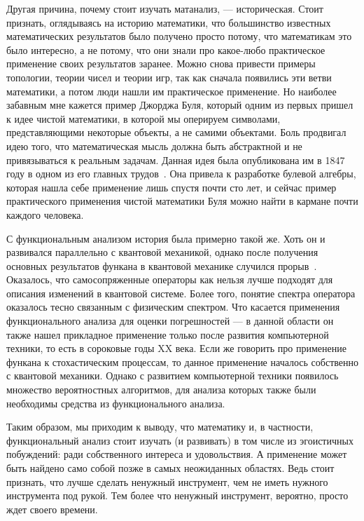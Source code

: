 \documentclass[russian]{article}
\begin{document}
Другая причина, почему стоит изучать матанализ, --- историческая. Стоит признать, оглядываясь на историю математики, что большинство известных математических результатов было получено просто потому, что математикам это было интересно, а не потому, что они знали про какое-любо практическое применение своих результатов заранее. Можно снова привести примеры топологии, теории чисел и теории игр, так как сначала появились эти ветви математики, а потом люди нашли им практическое применение. Но наиболее забавным мне кажется пример Джорджа Буля, который одним из первых пришел к идее чистой математики, в которой мы оперируем символами, представляющими некоторые объекты, а не самими объектами. Боль продвигал идею того, что математическая мысль должна быть абстрактной и не привязываться к реальным задачам. Данная идея была опубликована им в 1847 году в одном из его главных трудов~\cite{boole}. Она привела к разработке булевой алгебры, которая нашла себе применение лишь спустя почти сто лет, и сейчас пример практического применения чистой математики Буля можно найти в кармане почти каждого человека.

С функциональным анализом история была примерно такой же. Хоть он и развивался параллельно с квантовой механикой, однако после получения основных результатов функана в квантовой механике случился прорыв~\cite{quantum}. Оказалось, что самосопряженные операторы как нельзя лучше подходят для описания изменений в квантовой системе. Более того, понятие спектра оператора оказалось тесно связанным с физическим спектром.
Что касается применения функционального анализа для оценки погрешностей --- в данной области он также нашел прикладное применение только после развития компьютерной техники, то есть в сороковые годы XX века. Если же говорить про применение функана к стохастическим процессам, то данное применение началось собственно с квантовой механики. Однако с развитием компьютерной техники появилось множество вероятностных алгоритмов, для анализа которых также были необходимы средства из функционального анализа.

Таким образом, мы приходим к выводу, что математику и, в частности, функциональный анализ стоит изучать (и развивать) в том числе из эгоистичных побуждений: ради собственного интереса и удовольствия. А применение может быть найдено само собой позже в самых неожиданных областях. Ведь стоит признать, что лучше сделать ненужный инструмент, чем не иметь нужного инструмента под рукой. Тем более что ненужный инструмент, вероятно, просто ждет своего времени.
\end{document}
